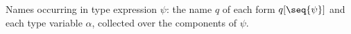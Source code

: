 Names occurring in type expression $\psi$: the name $q$ of each form $q[\seq{\psi}]$ and each type variable $\alpha$, collected over the components of $\psi$.
